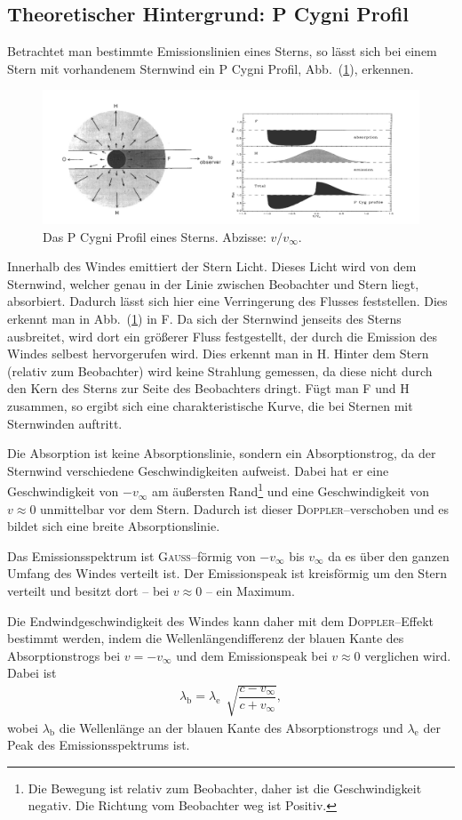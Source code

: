 \subsection{Theoretischer Hintergrund: P Cygni Profil} \label{sec:T-H-P-Cygni}
Betrachtet man bestimmte Emissionslinien eines Sterns, so lässt sich bei einem Stern mit vorhandenem Sternwind ein P Cygni Profil, Abb.\ (\ref{fig:p_cygni_profil}), erkennen.
\begin{figure}[t]
  \centering
  \includegraphics[width=.5\textwidth]{464_p_cygni_profil.png}
  \caption{Das P Cygni Profil eines Sterns. Abzisse: $v/v_\infty$.\cite{anleitung464}} \label{fig:p_cygni_profil}
\end{figure}

Innerhalb des Windes emittiert der Stern Licht.
Dieses Licht wird von dem Sternwind, welcher genau in der Linie zwischen Beobachter und Stern liegt, absorbiert.
Dadurch lässt sich hier eine Verringerung des Flusses feststellen.
Dies erkennt man in Abb.\ (\ref{fig:p_cygni_profil}) in F.
Da sich der Sternwind jenseits des Sterns ausbreitet, wird dort ein größerer Fluss festgestellt, der durch die Emission des Windes selbest hervorgerufen wird.
Dies erkennt man in H.
Hinter dem Stern (relativ zum Beobachter) wird keine Strahlung gemessen, da diese nicht durch den Kern des Sterns zur Seite des Beobachters dringt.
Fügt man F und H zusammen, so ergibt sich eine charakteristische Kurve, die bei Sternen mit Sternwinden auftritt.

Die Absorption ist keine Absorptionslinie, sondern ein Absorptionstrog, da der Sternwind verschiedene Geschwindigkeiten aufweist.
Dabei hat er eine Geschwindigkeit von $-v_\infty$ am äußersten Rand\footnote{Die Bewegung ist relativ zum Beobachter, daher ist die Geschwindigkeit negativ. Die Richtung vom Beobachter weg ist Positiv.} und eine Geschwindigkeit von $v\approx 0$ unmittelbar vor dem Stern.
Dadurch ist dieser \textsc{Doppler}--verschoben und es bildet sich eine breite Absorptionslinie.

Das Emissionsspektrum ist \textsc{Gauss}--förmig von $-v_\infty$ bis $v_\infty$ da es über den ganzen Umfang des Windes verteilt ist.
Der Emissionspeak ist kreisförmig um den Stern verteilt und besitzt dort -- bei $v\approx 0$ -- ein Maximum.

Die Endwindgeschwindigkeit des Windes kann daher mit dem \textsc{Doppler}--Effekt bestimmt werden, indem die Wellenlängendifferenz der blauen Kante des Absorptionstrogs bei $v=-v_\infty$ und dem Emissionspeak bei $v\approx 0$ verglichen wird.
Dabei ist
\begin{align} 
  \lambda _\text{b}=\lambda _\text{e}\,\sqrt[]{\dfrac{c-v_\infty}{c+v_\infty}}
,\end{align} 
wobei $\lambda _\text{b}$ die Wellenlänge an der blauen Kante des Absorptionstrogs und $\lambda _\text{e}$ der Peak des Emissionsspektrums ist.
